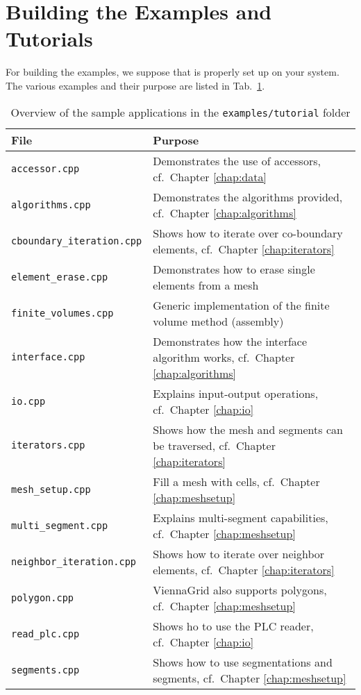 \section{Building the Examples and Tutorials}
For building the examples, we suppose that {\CMake} is properly set up
on your system. The various examples and their purpose are listed in
Tab.~\ref{tab:tutorial-dependencies}.

\begin{table}[tb]
\begin{center}
\begin{tabular}{l|p{9.3cm}}
File & Purpose\\
\hline
\texttt{accessor.cpp}              & Demonstrates the use of accessors, cf.~Chapter \ref{chap:data} \\
\texttt{algorithms.cpp}            & Demonstrates the algorithms provided, cf.~Chapter \ref{chap:algorithms} \\
\texttt{cboundary\_iteration.cpp}  & Shows how to iterate over co-boundary elements, cf.~Chapter \ref{chap:iterators} \\
\texttt{element\_erase.cpp}        & Demonstrates how to erase single elements from a mesh \\
\texttt{finite\_volumes.cpp}       & Generic implementation of the finite volume method (assembly) \\
\texttt{interface.cpp}             & Demonstrates how the interface algorithm works, cf.~Chapter \ref{chap:algorithms} \\
\texttt{io.cpp}                    & Explains input-output operations, cf.~Chapter \ref{chap:io} \\
\texttt{iterators.cpp}             & Shows how the mesh and segments can be traversed, cf.~Chapter \ref{chap:iterators} \\
\texttt{mesh\_setup.cpp}           & Fill a mesh with cells, cf.~Chapter \ref{chap:meshsetup} \\
\texttt{multi\_segment.cpp}        & Explains multi-segment capabilities, cf.~Chapter \ref{chap:meshsetup} \\
\texttt{neighbor\_iteration.cpp}   & Shows how to iterate over neighbor elements, cf.~Chapter \ref{chap:iterators} \\
\texttt{polygon.cpp}               & ViennaGrid also supports polygons, cf.~Chapter \ref{chap:meshsetup} \\
\texttt{read\_plc.cpp}             & Shows ho to use the PLC reader, cf.~Chapter \ref{chap:io} \\
\texttt{segments.cpp}              & Shows how to use segmentations and segments, cf.~Chapter \ref{chap:meshsetup}
\end{tabular}
\caption{Overview of the sample applications in the \texttt{examples/tutorial} folder}
\label{tab:tutorial-dependencies}
\end{center}
\end{table}

